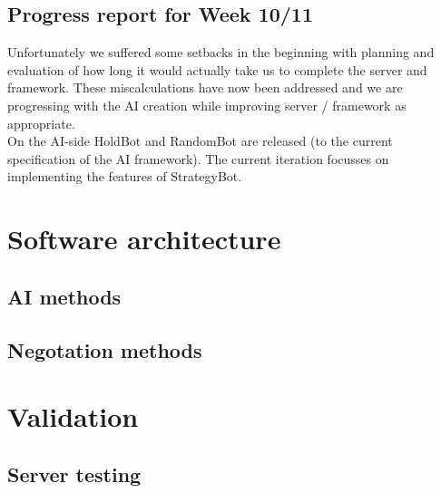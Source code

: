 \documentclass[11pt]{article}
\begin{document}
\subsection{Progress report for Week 10/11}
Unfortunately we suffered some setbacks in the beginning with planning and 
evaluation of how long it would actually take us to complete the server and
framework. These miscalculations have now been addressed and we are progressing
with the AI creation while improving server / framework as appropriate. 
\\
On the AI-side HoldBot and RandomBot are released (to the current specification of the
AI framework). The current iteration focusses on implementing the features of
StrategyBot.


\section{Software architecture}

\subsection{AI methods}

\subsection{Negotation methods}

\section{Validation}

\subsection{Server testing}
\end{document}
